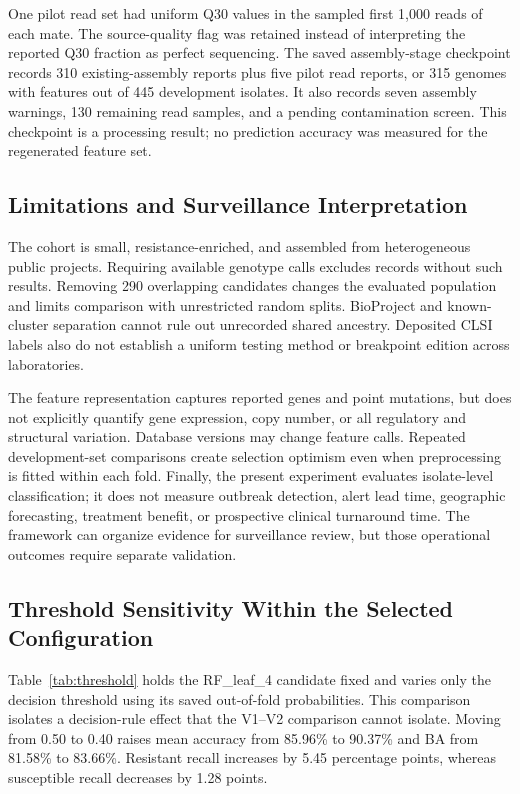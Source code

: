 \documentclass[conference]{IEEEtran}
\begin{document}
One pilot read set had uniform Q30 values in the sampled first 1,000 reads of each mate. The source-quality flag was retained instead of interpreting the reported Q30 fraction as perfect sequencing. The saved assembly-stage checkpoint records 310 existing-assembly reports plus five pilot read reports, or 315 genomes with features out of 445 development isolates. It also records seven assembly warnings, 130 remaining read samples, and a pending contamination screen. This checkpoint is a processing result; no prediction accuracy was measured for the regenerated feature set.

\subsection{Limitations and Surveillance Interpretation}
The cohort is small, resistance-enriched, and assembled from heterogeneous public projects. Requiring available genotype calls excludes records without such results. Removing 290 overlapping candidates changes the evaluated population and limits comparison with unrestricted random splits. BioProject and known-cluster separation cannot rule out unrecorded shared ancestry. Deposited CLSI labels also do not establish a uniform testing method or breakpoint edition across laboratories.

The feature representation captures reported genes and point mutations, but does not explicitly quantify gene expression, copy number, or all regulatory and structural variation. Database versions may change feature calls. Repeated development-set comparisons create selection optimism even when preprocessing is fitted within each fold. Finally, the present experiment evaluates isolate-level classification; it does not measure outbreak detection, alert lead time, geographic forecasting, treatment benefit, or prospective clinical turnaround time. The framework can organize evidence for surveillance review, but those operational outcomes require separate validation.

\subsection{Threshold Sensitivity Within the Selected Configuration}
Table~\ref{tab:threshold} holds the RF\_leaf\_4 candidate fixed and varies only the decision threshold using its saved out-of-fold probabilities. This comparison isolates a decision-rule effect that the V1--V2 comparison cannot isolate. Moving from 0.50 to 0.40 raises mean accuracy from 85.96\% to 90.37\% and BA from 81.58\% to 83.66\%. Resistant recall increases by 5.45 percentage points, whereas susceptible recall decreases by 1.28 points.
\end{document}
